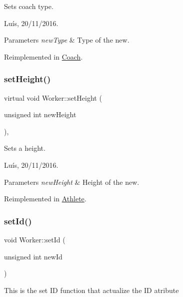 Sets coach type. 

Luís, 20/11/2016. 


\begin{DoxyParams}{Parameters}
{\em new\+Type} & Type of the new. \\
\hline
\end{DoxyParams}


Reimplemented in \hyperlink{class_coach_a72de329d96f180eca4108c7103946ee3}{Coach}.

\hypertarget{class_worker_a64124dca31baa9b110779c7698c15a57}{}\label{class_worker_a64124dca31baa9b110779c7698c15a57} 
\subsubsection{\texorpdfstring{set\+Height()}{setHeight()}}
{\footnotesize\ttfamily virtual void Worker\+::set\+Height (\begin{DoxyParamCaption}\item[{unsigned int}]{new\+Height }\end{DoxyParamCaption})\hspace{0.3cm}{\ttfamily [inline]}, {\ttfamily [virtual]}}



Sets a height. 

Luís, 20/11/2016. 


\begin{DoxyParams}{Parameters}
{\em new\+Height} & Height of the new. \\
\hline
\end{DoxyParams}


Reimplemented in \hyperlink{class_athlete_ab96f3138f984bb830aa69f1502961dc8}{Athlete}.

\hypertarget{class_worker_a213180d9f1e4822113f654f7f4ed147c}{}\label{class_worker_a213180d9f1e4822113f654f7f4ed147c} 
\subsubsection{\texorpdfstring{set\+Id()}{setId()}}
{\footnotesize\ttfamily void Worker\+::set\+Id (\begin{DoxyParamCaption}\item[{unsigned int}]{new\+Id }\end{DoxyParamCaption})}

This is the set ID function that actualize the ID atribute \hypertarget{class_worker_a9113351bf9395094fa0e1d1cfa426881}{}\label{class_worker_a9113351bf9395094fa0e1d1cfa426881} 
